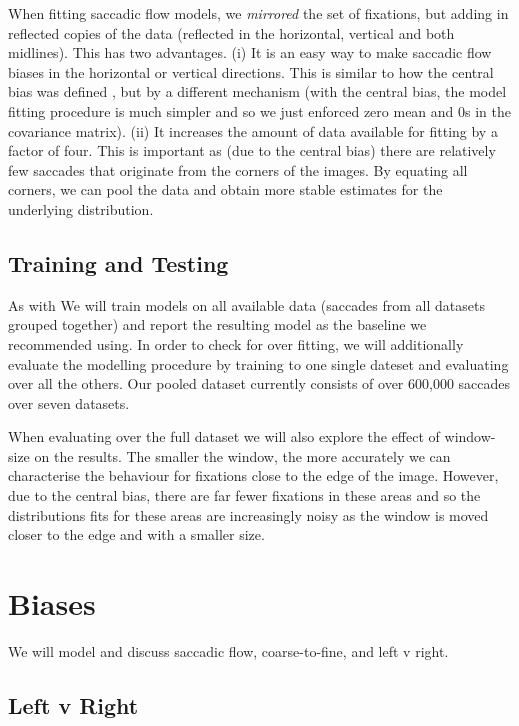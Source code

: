 \documentclass[a4paper, onecolumn, oneside, 11pt]{article}
\begin{document}
When fitting saccadic flow models,  we \textit{mirrored} the set of fixations, but adding in reflected copies of the data (reflected in the horizontal, vertical and both midlines). This has two advantages. (i) It is an easy way to make saccadic flow biases in the horizontal or vertical directions. This is similar to how the central bias was defined \cite{clarke-tatler2014}, but by a different mechanism (with the central bias, the model fitting procedure is much simpler and so we just enforced zero mean and 0s in the covariance matrix). (ii) It increases the amount of data available for fitting by a factor of four. This is important as (due to the central bias) there are relatively few saccades that originate from the corners of the images. By equating all corners, we can pool the data and obtain more stable estimates for the underlying distribution. 


\subsection{Training and Testing}

As with \cite{clarke-tatler2014} We will train models on all available data (saccades from all datasets grouped together) and report the resulting model as the baseline we recommended using. In order to check for over fitting, we will additionally evaluate the modelling procedure by training to one single dateset and evaluating over all the others. Our pooled dataset currently consists of over 600,000 saccades over seven datasets. 

When evaluating over the full dataset we will also explore the effect of window-size on the results. The smaller the window, the more accurately we can characterise the behaviour for fixations close to the edge of the image. However, due to the central bias, there are far fewer fixations in these areas and so the distributions fits for these areas are increasingly noisy as the window is moved closer to the edge and with a smaller size. 


\section{Biases}

We will model and discuss saccadic flow, coarse-to-fine, and left v right. 

\subsection{Left v Right}
\end{document}
